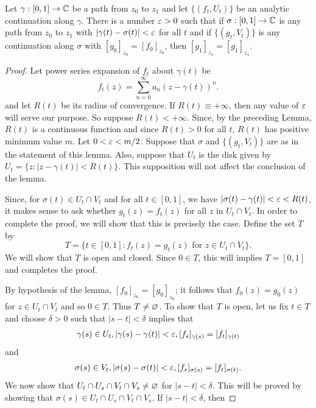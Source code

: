 \begin{lemma}\label{analytic continuation along curve small pertubation}
Let $\gamma:[0,1]\to\mathbb{C}$ be a path from $z_0$ to $z_1$ and let $\{(f_t,U_t)\}$ be an analytic continuation along $\gamma$. There is a number $\varepsilon>0$ such that if $\sigma:[0,1]\to\mathbb{C}$ is any path from $z_0$ to $z_1$ with $|\gamma(t)-\sigma(t)|<\varepsilon$ for all $t$ and if $\{(g_t,V_t)\}$ is any continuation along $\sigma$ with $[g_0]_{z_0}=[f_0]_{z_0}$, then $[g_1]_{z_1}=[g_1]_{z_1}$.
\end{lemma}
\begin{proof}
Let power series expansion of $f_t$ about $\gamma(t)$ be
\[f_t(z)=\sum_{n=0}^{\infty}a_n(z-\gamma(t))^n.\]
and let $R(t)$ be its radius of convergence. If $R(t)\equiv+\infty$, then any value of $\varepsilon$ will serve our purpose. So suppose $R(t)<+\infty$. Since, by the preceding Lemma, $R(t)$ is a continuous function and since $R(t)>0$ for all $t$, $R(t)$ has positive minimum value $m$. Let $0<\varepsilon<m/2$. Suppose that $\sigma$ and $\{(g_t,V_t)\}$ are as in the statement of this lemma. Also, suppose that $U_t$ is the disk given by $U_t=\{z:|z-\gamma(t)|<R(t)\}$. This supposition will not affect the conclusion of the lemma.\par
Since, for $\sigma(t)\in U_t\cap V_t$ and for all $t\in[0,1]$, we have $|\sigma(t)-\gamma(t)|<\varepsilon<R(t)$, it makes sense to ask whether $g_t(z)=f_t (z)$ for all $z$ in $U_t\cap V_t$. In order to complete the proof, we will show that this is precisely the case. Define the set $T$ by
\[T=\{t\in[0,1]:f_t(z)=g_t(z)\text{ for }z\in U_t\cap V_t\}.\]
We will show that $T$ is open and closed. Since $0\in T$, this will implies $T=[0,1]$ and completes the proof.\par
By hypothesis of the lemma, $[f_0]_{z_0}=[g_0]_{z_0}$; it follows that $f_0(z)=g_0(z)$ for $z\in U_t\cap V_t$ and so $0\in T$. Thus $T\neq\varnothing$. To show that $T$ is open, let us fix $t\in T$ and choose $\delta>0$ such that $|s-t|<\delta$ implies that
\begin{align}\label{analytic continuation along curve small pertubation-1}
\gamma(s)\in U_t,|\gamma(s)-\gamma(t)|<\varepsilon,[f_s]_{\gamma(s)}=[f_t]_{\gamma(t)}
\end{align}
and
\begin{align}\label{analytic continuation along curve small pertubation-2}
\sigma(s)\in V_t,|\sigma(s)-\sigma(t)|<\varepsilon,[f_s]_{\sigma(s)}=[f_t]_{\sigma(t)}.
\end{align}
We now show that $U_t\cap U_s\cap V_t\cap V_s\neq\varnothing$ for $|s-t|<\delta$. This will be proved by showing that $\sigma(s)\in U_t\cap U_s\cap V_t\cap V_s$. If $|s-t|<\delta$, then

\end{proof}
